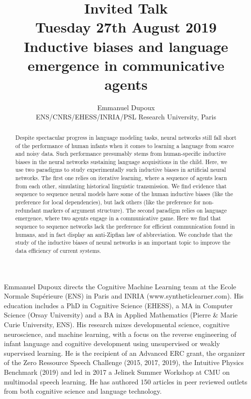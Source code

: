 \documentclass[11pt]{article}
\title{Invited Talk\\
  {\small Tuesday 27th August 2019}\\
  Inductive biases and language emergence in communicative agents}
\author{Emmanuel Dupoux\\
  ENS/CNRS/EHESS/INRIA/PSL Research University, Paris}
\begin{document}
\maketitle
\begin{abstract}
  Despite spectacular progress in language modeling tasks, neural networks still fall short of the performance of human infants when it comes to learning a language from scarce and noisy data. Such performance presumably stems from human-specific inductive biases in the neural networks sustaining language acquisitions in the child. Here, we use two paradigms to study experimentally such inductive biases in artificial neural networks. The first one relies on iterative learning, where a sequence of agents learn from each other, simulating historical linguistic transmission. We find evidence that sequence to sequence neural models have some of the human inductive biases (like the preference for local dependencies), but lack others (like the preference for non-redundant markers of argument structure). The second paradigm relies on language emergence, where two agents engage in a communicative game. Here we find that sequence to sequence networks lack the preference for efficient communication found in humans, and in fact display an anti-Zipfian law of abbreviation. We conclude that the study of the inductive biases of neural networks is an important topic to improve the data efficiency of current systems.
\end{abstract}

\vspace{4mm}
\begin{shortbio}
Emmanuel Dupoux directs the Cognitive Machine Learning team at the Ecole Normale Supérieure (ENS) in Paris and INRIA (www.syntheticlearner.com).  His education includes a PhD in Cognitive Science (EHESS), a MA in Computer Science (Orsay University) and a BA in Applied Mathematics (Pierre \& Marie Curie University, ENS). His research mixes developmental science, cognitive neuroscience, and machine learning, with a focus on the reverse engineering of infant language and cognitive development using unsupervised or weakly supervised learning. He is the recipient of an Advanced ERC grant, the organizer of the Zero Ressource Speech Challenge (2015, 2017, 2019), the Intuitive Physics Benchmark (2019) and led in 2017 a Jelinek Summer Workshop at CMU on multimodal speech learning. He has authored 150 articles in peer reviewed outlets from both cognitive science and language technology.
\end{shortbio}
\end{document}
